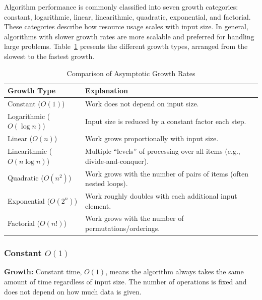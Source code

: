 \documentclass[12pt]{article}
\begin{document}
Algorithm performance is commonly classified into seven growth categories: constant, logarithmic, linear, linearithmic, quadratic, exponential, and factorial. These categories describe how resource usage scales with input size. In general, algorithms with slower growth rates are more scalable and preferred for handling large problems. Table~\ref{tab:growth-summary} presents the different growth types, arranged from the slowest to the fastest
growth.

\begin{table}[H]
	\centering
	\begin{tabularx}{\linewidth}{@{}lX@{}}
		\toprule
		\textbf{Growth Type}        & \textbf{Explanation}                                                         \\
		\midrule
		Constant ($O(1)$)           & Work does not depend on input size.                                          \\
		Logarithmic ($O(\log n)$)   & Input size is reduced by a constant factor each step.                        \\
		Linear ($O(n)$)             & Work grows proportionally with input size.                                   \\
		Linearithmic ($O(n\log n)$) & Multiple ``levels'' of processing over all items (e.g., divide-and-conquer). \\
		Quadratic ($O(n^2)$)        & Work grows with the number of pairs of items (often nested loops).           \\
		Exponential ($O(2^n)$)      & Work roughly doubles with each additional input element.                     \\
		Factorial ($O(n!)$)         & Work grows with the number of permutations/orderings.                        \\
		\bottomrule
	\end{tabularx}
	\caption{Comparison of Asymptotic Growth Rates}
	\label{tab:growth-summary}
\end{table}

\subsubsection{Constant $O(1)$}

\textbf{Growth:} Constant time, $O(1)$, means the algorithm always takes the same amount of time
regardless of input size. The number of operations is fixed and does not depend on
how much data is given.\\
\end{document}
